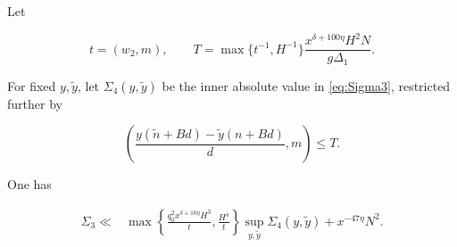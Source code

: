 Let

\begin{equation}\label{eq:tT}
 t=(w_2,m),\qquad
 T=\max\{t^{-1},H^{-1}\}
 \frac{x^{\delta+100\eta}H^2N}{g\Delta_1}.
\end{equation}

For fixed $y,\widetilde y$, let $\Sigma_4(y,\widetilde y)$ be the inner
absolute value in \cref{eq:Sigma3}, restricted further by

\begin{equation}\label{eq:retained-gcd}
 \left(
 \frac{y(\widetilde n+Bd)-\widetilde y(n+Bd)}d,m
 \right)\le T.
\end{equation}

\begin{lemma}\label{lem:diagonal-removal}
One has

\begin{align}
 \Sigma_3\ll{}&
 \max\left\{
 \frac{q_0^2x^{\delta+10\eta}H^3}{t},
 \frac{H^4}{t}
 \right\}
 \sup_{y,\widetilde y}\Sigma_4(y,\widetilde y)
 +x^{-47\eta}N^2.
 \label{eq:diagonal-removal}
\end{align}
\end{lemma}

